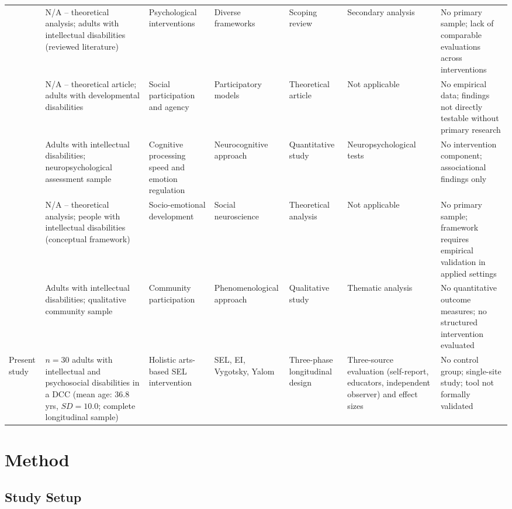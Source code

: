 \documentclass[12pt,a4paper]{article}
\begin{document}
{\begin{landscape}
\begin{longtable}{p{2.5cm} p{3.0cm} p{3.8cm} p{3.0cm} p{2.8cm} p{3.0cm} p{3.8cm}}
\citet{witwer2022} & N/A -- theoretical analysis; adults with intellectual disabilities (reviewed literature) & Psychological interventions & Diverse frameworks & Scoping review & Secondary analysis & No primary sample; lack of comparable evaluations across interventions \\
\citet{mcnaughton2025} & N/A -- theoretical article; adults with developmental disabilities & Social participation and agency & Participatory models & Theoretical article & Not applicable & No empirical data; findings not directly testable without primary research \\
\citet{okafor2025} & Adults with intellectual disabilities; neuropsychological assessment sample & Cognitive processing speed and emotion regulation & Neurocognitive approach & Quantitative study & Neuropsychological tests & No intervention component; associational findings only \\
\citet{sappok2022} & N/A -- theoretical analysis; people with intellectual disabilities (conceptual framework) & Socio-emotional development & Social neuroscience & Theoretical analysis & Not applicable & No primary sample; framework requires empirical validation in applied settings \\
\citet{parsakia2024} & Adults with intellectual disabilities; qualitative community sample & Community participation & Phenomenological approach & Qualitative study & Thematic analysis & No quantitative outcome measures; no structured intervention evaluated \\
Present study & $n=30$ adults with intellectual and psychosocial disabilities in a DCC (mean age: 36.8 yrs, $SD=10.0$; complete longitudinal sample) & Holistic arts-based SEL intervention & SEL, EI, Vygotsky, Yalom & Three-phase longitudinal design & Three-source evaluation (self-report, educators, independent observer) and effect sizes & No control group; single-site study; tool not formally validated \\
\end{longtable}
\end{landscape}
}

\section{Method}

\subsection{Study Setup}
\end{document}

